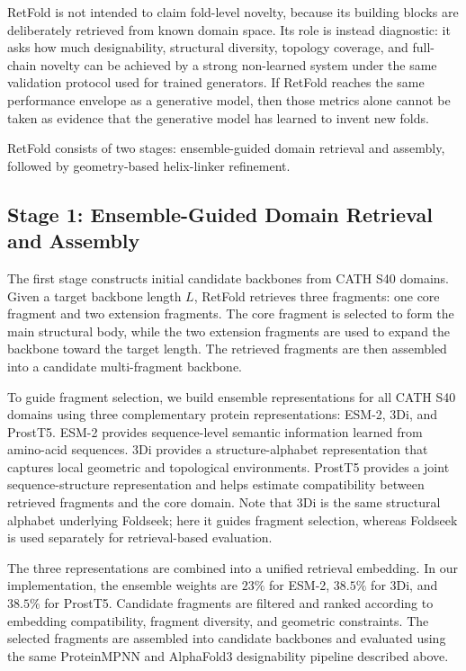 \documentclass[letterpaper]{article} %
\begin{document}
RetFold is not intended to claim fold-level novelty, because its building blocks are deliberately retrieved from known domain space. Its role is instead diagnostic: it asks how much designability, structural diversity, topology coverage, and full-chain novelty can be achieved by a strong non-learned system under the same validation protocol used for trained generators. If RetFold reaches the same performance envelope as a generative model, then those metrics alone cannot be taken as evidence that the generative model has learned to invent new folds.

RetFold consists of two stages: ensemble-guided domain retrieval and assembly, followed by geometry-based helix-linker refinement.

\subsection{Stage 1: Ensemble-Guided Domain Retrieval and Assembly}

The first stage constructs initial candidate backbones from CATH S40 domains. Given a target backbone length $L$, RetFold retrieves three fragments: one core fragment and two extension fragments. The core fragment is selected to form the main structural body, while the two extension fragments are used to expand the backbone toward the target length. The retrieved fragments are then assembled into a candidate multi-fragment backbone.

To guide fragment selection, we build ensemble representations for all CATH S40 domains using three complementary protein representations: ESM-2, 3Di, and ProstT5. ESM-2 provides sequence-level semantic information learned from amino-acid sequences. 3Di provides a structure-alphabet representation that captures local geometric and topological environments. ProstT5 provides a joint sequence-structure representation and helps estimate compatibility between retrieved fragments and the core domain. Note that 3Di is the same structural alphabet underlying Foldseek; here it guides fragment selection, whereas Foldseek is used separately for retrieval-based evaluation.

The three representations are combined into a unified retrieval embedding. In our implementation, the ensemble weights are $23\%$ for ESM-2, $38.5\%$ for 3Di, and $38.5\%$ for ProstT5. Candidate fragments are filtered and ranked according to embedding compatibility, fragment diversity, and geometric constraints. The selected fragments are assembled into candidate backbones and evaluated using the same ProteinMPNN and AlphaFold3 designability pipeline described above.
\end{document}

